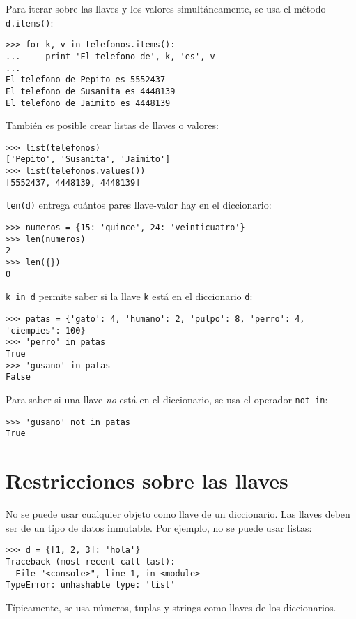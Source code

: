 Para iterar sobre las llaves y los valores simultáneamente, se usa el
método \lstinline!d.items()!:

\begin{lstlisting}
>>> for k, v in telefonos.items():
...     print 'El telefono de', k, 'es', v
...
El telefono de Pepito es 5552437
El telefono de Susanita es 4448139
El telefono de Jaimito es 4448139
\end{lstlisting}

También es posible crear listas de llaves o valores:

\begin{lstlisting}
>>> list(telefonos)
['Pepito', 'Susanita', 'Jaimito']
>>> list(telefonos.values())
[5552437, 4448139, 4448139]
\end{lstlisting}

\lstinline!len(d)! entrega cuántos pares llave-valor hay en el
diccionario:

\begin{lstlisting}
>>> numeros = {15: 'quince', 24: 'veinticuatro'}
>>> len(numeros)
2
>>> len({})
0
\end{lstlisting}

\lstinline!k in d! permite saber si la llave \lstinline!k! está en el
diccionario \lstinline!d!:

\begin{lstlisting}
>>> patas = {'gato': 4, 'humano': 2, 'pulpo': 8, 'perro': 4, 'ciempies': 100}
>>> 'perro' in patas
True
>>> 'gusano' in patas
False
\end{lstlisting}

Para saber si una llave \emph{no} está en el diccionario, se usa el
operador \lstinline!not in!:

\begin{lstlisting}
>>> 'gusano' not in patas
True
\end{lstlisting}

\section{Restricciones sobre las llaves}

No se puede usar cualquier objeto como llave de un diccionario. Las
llaves deben ser de un tipo de datos inmutable. Por ejemplo, no se puede
usar listas:

\begin{lstlisting}
>>> d = {[1, 2, 3]: 'hola'}
Traceback (most recent call last):
  File "<console>", line 1, in <module>
TypeError: unhashable type: 'list'
\end{lstlisting}

Típicamente, se usa números, tuplas y strings como llaves de los
diccionarios.
